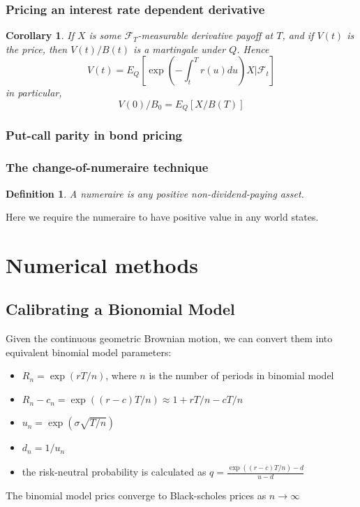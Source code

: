\documentclass[a4paper,13pt]{report}
\newcommand{\cF}{\mathcal{F}}
\newtheorem{corollary}{Corollary}[theorem]
\newtheorem*{definition}{Definition}
\begin{document}
\subsection{Pricing an interest rate dependent derivative}
\begin{corollary}
If $X$ is some $\cF_T$-measurable derivative payoff at $T$, and if $V(t)$ is the price, then $V(t)/B(t)$ is a martingale under $Q$. Hence
$$V(t) = E_Q[\exp(-\int_t^T r(u)du) X | \cF_t]$$
in particular,
$$V(0)/B_0 = E_Q[X/B(T)]$$
\end{corollary}


\subsection{Put-call parity in bond pricing}
\cite{cairns2004interest}



\subsection{The change-of-numeraire technique}
\begin{definition}
A numeraire is any positive non-dividend-paying asset.
\end{definition}
Here we require the numeraire to have positive value in any world states. 


\chapter{Numerical methods}
\section{Calibrating a Bionomial Model}
Given the continuous geometric Brownian motion, we can convert them into equivalent binomial model parameters:
\begin{itemize}
    \item $R_n = \exp(r T/n)$, where $n$ is the number of periods in binomial model
    \item $R_n-c_n = \exp((r-c)T/n) \approx 1+rT/n-cT/n$
    \item $u_n = \exp(\sigma \sqrt{T/n})$
    \item $d_n = 1/u_n$
    \item the risk-neutral probability is calculated as $q=\frac{\exp((r-c)T/n)-d}{u-d}$
\end{itemize}

The binomial model prics converge to Black-scholes prices as $n\rightarrow \infty$
\printbibliography[title={Whole bibliography}]
\end{document}
